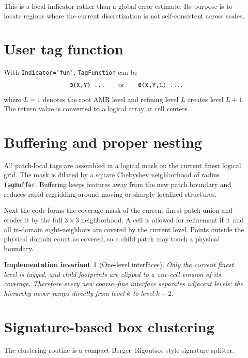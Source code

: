 \documentclass[11pt,oneside,openany]{book}
\newcommand{\code}[1]{\textnormal{\texttt{#1}}}
\newtheorem{invariant}{Implementation invariant}[chapter]
\begin{document}
This is a local indicator rather than a global error estimate. Its purpose is to locate regions where the current discretization is not self-consistent across scales.

\section{User tag function}
With \code{Indicator='fun'}, \code{TagFunction} can be
\[
  \code{@(X,Y) ...}
  \qquad\text{or}\qquad
  \code{@(X,Y,L) ...},
\]
where $L=1$ denotes the root AMR level and refining level $L$ creates level $L+1$. The return value is converted to a logical array at cell centers.

\section{Buffering and proper nesting}
All patch-local tags are assembled in a logical mask on the current finest logical grid. The mask is dilated by a square Chebyshev neighborhood of radius \code{TagBuffer}. Buffering keeps features away from the new patch boundary and reduces rapid regridding around moving or sharply localized structures.

Next the code forms the coverage mask of the current finest patch union and erodes it by the full $3\times3$ neighborhood. A cell is allowed for refinement if it and all in-domain eight-neighbors are covered by the current level. Points outside the physical domain count as covered, so a child patch may touch a physical boundary.

\begin{invariant}[One-level interfaces]
Only the current finest level is tagged, and child footprints are clipped to a one-cell erosion of its coverage. Therefore every new coarse--fine interface separates adjacent levels; the hierarchy never jumps directly from level $k$ to level $k+2$.
\end{invariant}

\section{Signature-based box clustering}
The clustering routine is a compact Berger--Rigoutsos-style signature splitter.
\end{document}
